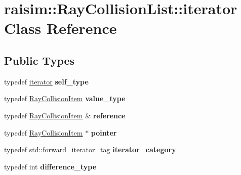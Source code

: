 \hypertarget{classraisim_1_1RayCollisionList_1_1iterator}{}\section{raisim\+:\+:Ray\+Collision\+List\+:\+:iterator Class Reference}
\label{classraisim_1_1RayCollisionList_1_1iterator}
\subsection*{Public Types}
\begin{DoxyCompactItemize}
\item 
\mbox{\label{classraisim_1_1RayCollisionList_1_1iterator_a59d196d9ad8d68aadcb97eabed261481}} 
typedef \hyperlink{classraisim_1_1RayCollisionList_1_1iterator}{iterator} {\bfseries self\+\_\+type}
\item 
\mbox{\label{classraisim_1_1RayCollisionList_1_1iterator_a07bc0120ba3a4cf26cb4dc3c01a00edf}} 
typedef \hyperlink{classraisim_1_1RayCollisionItem}{Ray\+Collision\+Item} {\bfseries value\+\_\+type}
\item 
\mbox{\label{classraisim_1_1RayCollisionList_1_1iterator_aed87c451b03db8b809637a3c6e241fe1}} 
typedef \hyperlink{classraisim_1_1RayCollisionItem}{Ray\+Collision\+Item} \& {\bfseries reference}
\item 
\mbox{\label{classraisim_1_1RayCollisionList_1_1iterator_a669155715af984a5dec4acb94e46acb0}} 
typedef \hyperlink{classraisim_1_1RayCollisionItem}{Ray\+Collision\+Item} $\ast$ {\bfseries pointer}
\item 
\mbox{\label{classraisim_1_1RayCollisionList_1_1iterator_ad3c9d37a2b355950675f50c2019f28d2}} 
typedef std\+::forward\+\_\+iterator\+\_\+tag {\bfseries iterator\+\_\+category}
\item 
\mbox{\label{classraisim_1_1RayCollisionList_1_1iterator_a7a4c3538fe673e76384c93a7071dac8a}} 
typedef int {\bfseries difference\+\_\+type}
\end{DoxyCompactItemize}
